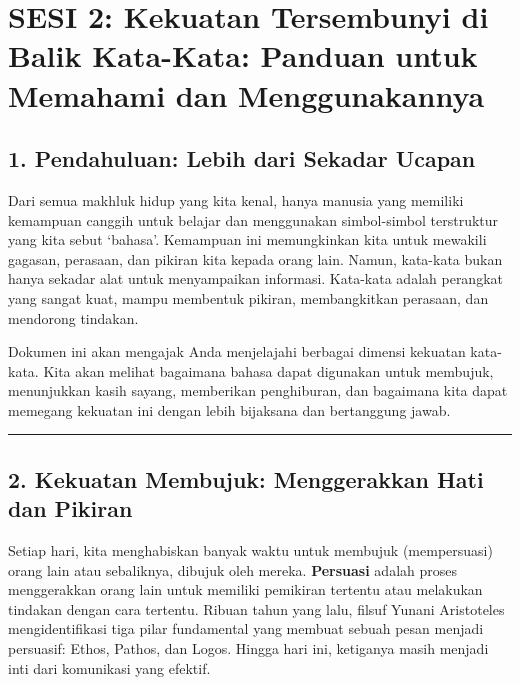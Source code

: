 \documentclass[
  letterpaper,
  DIV=11,
  numbers=noendperiod]{scrreprt}
\begin{document}
\section{SESI 2: Kekuatan Tersembunyi di Balik Kata-Kata: Panduan untuk
Memahami dan
Menggunakannya}\label{sesi-2-kekuatan-tersembunyi-di-balik-kata-kata-panduan-untuk-memahami-dan-menggunakannya}

\subsection{\texorpdfstring{1. \textbf{Pendahuluan: Lebih dari Sekadar
Ucapan}}{1. Pendahuluan: Lebih dari Sekadar Ucapan}}\label{pendahuluan-lebih-dari-sekadar-ucapan}

Dari semua makhluk hidup yang kita kenal, hanya manusia yang memiliki
kemampuan canggih untuk belajar dan menggunakan simbol-simbol
terstruktur yang kita sebut `bahasa'. Kemampuan ini memungkinkan kita
untuk mewakili gagasan, perasaan, dan pikiran kita kepada orang lain.
Namun, kata-kata bukan hanya sekadar alat untuk menyampaikan informasi.
Kata-kata adalah perangkat yang sangat kuat, mampu membentuk pikiran,
membangkitkan perasaan, dan mendorong tindakan.

Dokumen ini akan mengajak Anda menjelajahi berbagai dimensi kekuatan
kata-kata. Kita akan melihat bagaimana bahasa dapat digunakan untuk
membujuk, menunjukkan kasih sayang, memberikan penghiburan, dan
bagaimana kita dapat memegang kekuatan ini dengan lebih bijaksana dan
bertanggung jawab.

\begin{center}\rule{0.5\linewidth}{0.5pt}\end{center}

\subsection{2. Kekuatan Membujuk: Menggerakkan Hati dan
Pikiran}\label{kekuatan-membujuk-menggerakkan-hati-dan-pikiran}

Setiap hari, kita menghabiskan banyak waktu untuk membujuk (mempersuasi)
orang lain atau sebaliknya, dibujuk oleh mereka. \textbf{Persuasi}
adalah proses menggerakkan orang lain untuk memiliki pemikiran tertentu
atau melakukan tindakan dengan cara tertentu. Ribuan tahun yang lalu,
filsuf Yunani Aristoteles mengidentifikasi tiga pilar fundamental yang
membuat sebuah pesan menjadi persuasif: Ethos, Pathos, dan Logos. Hingga
hari ini, ketiganya masih menjadi inti dari komunikasi yang efektif.
\end{document}
